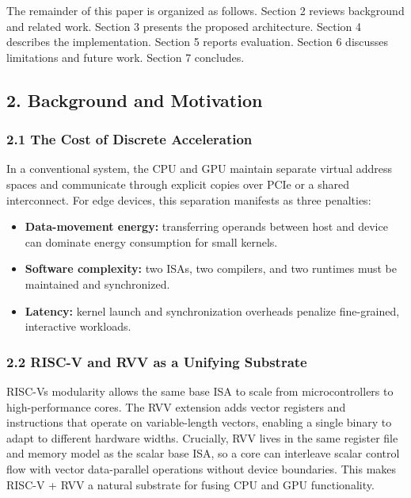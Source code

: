 The remainder of this paper is organized as follows. Section 2 reviews
background and related work. Section 3 presents the proposed
architecture. Section 4 describes the implementation. Section 5 reports
evaluation. Section 6 discusses limitations and future work. Section 7
concludes.

\subsection{2. Background and
Motivation}\label{2-background-and-motivation}

\subsubsection{2.1 The Cost of Discrete
Acceleration}\label{21-the-cost-of-discrete-acceleration}

In a conventional system, the CPU and GPU maintain separate virtual
address spaces and communicate through explicit copies over PCIe or a
shared interconnect. For edge devices, this separation manifests as
three penalties:

\begin{itemize}
\tightlist
\item
  \textbf{Data-movement energy:} transferring operands between host and
  device can dominate energy consumption for small kernels.
\item
  \textbf{Software complexity:} two ISAs, two compilers, and two
  runtimes must be maintained and synchronized.
\item
  \textbf{Latency:} kernel launch and synchronization overheads penalize
  fine-grained, interactive workloads.
\end{itemize}

\subsubsection{2.2 RISC-V and RVV as a Unifying
Substrate}\label{22-risc-v-and-rvv-as-a-unifying-substrate}

RISC-V\textquotesingle s modularity allows the same base ISA to scale
from microcontrollers to high-performance cores. The RVV extension adds
vector registers and instructions that operate on variable-length
vectors, enabling a single binary to adapt to different hardware widths.
Crucially, RVV lives in the same register file and memory model as the
scalar base ISA, so a core can interleave scalar control flow with
vector data-parallel operations without device boundaries. This makes
RISC-V + RVV a natural substrate for fusing CPU and GPU functionality.

